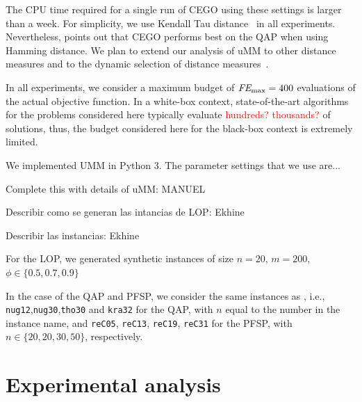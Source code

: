 \documentclass[runningheads]{llncs}
\begin{document}
The CPU time required for a single run of CEGO using these settings is larger
than a week.  For simplicity, we use Kendall Tau distance~\citep{?} in all
experiments. Nevertheless,
\citet{ZaeStoFriFisNauBar2014} points out that CEGO performs best on the QAP
when using Hamming distance. We plan to extend our analysis of uMM to other
distance measures and to the dynamic selection of distance
measures~\citep{ZaeStoBar2014:ppsn}.

In all experiments, we consider a maximum budget of $\textit{FE}_{\max}=400$ evaluations of
the actual objective function. In a white-box context, state-of-the-art
algorithms for the problems considered here typically evaluate
\textcolor{red}{hundreds? thousands?} of solutions, thus, the budget considered
here for the black-box context is extremely limited.

We implemented UMM in Python 3. The parameter settings that we use are...

Complete this with details of uMM: MANUEL



Describir como se generan las intancias de LOP: Ekhine

Describir las instancias: Ekhine

For the LOP, we generated synthetic instances of size $n=20$, $m=200$, $\phi\in\{0.5,0.7,0.9\}$

In the case of the QAP and PFSP, we consider the same instances as
\citet{ZaeStoFriFisNauBar2014,ZaeStoBar2014:ppsn}, i.e.,
\texttt{nug12},\texttt{nug30},\texttt{tho30} and \texttt{kra32} for the QAP,
with $n$ equal to the number in the instance name, and \texttt{reC05},
\texttt{reC13}, \texttt{reC19}, \texttt{reC31} for the PFSP, with
$n \in \{20, 20, 30, 50\}$, respectively.

\section{Experimental analysis}
\end{document}
